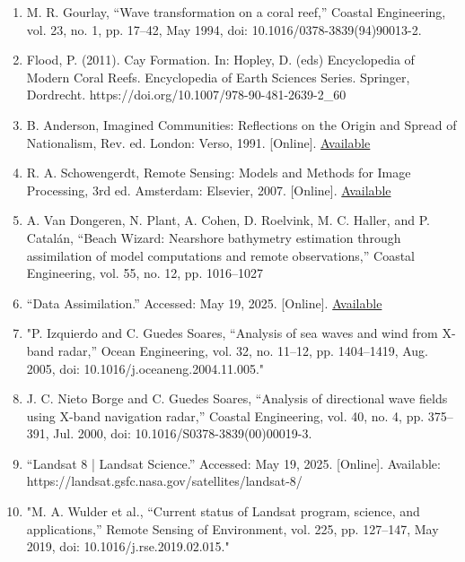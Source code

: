 \documentclass{article}
\begin{document}
\begin{enumerate}
    \item{M. R. Gourlay, “Wave transformation on a coral reef,” Coastal Engineering, vol. 23, no. 1, pp. 17–42, May 1994, doi: 10.1016/0378-3839(94)90013-2.}

    \item{Flood, P. (2011). Cay Formation. In: Hopley, D. (eds) Encyclopedia of Modern Coral Reefs. Encyclopedia of Earth Sciences Series. Springer, Dordrecht. https://doi.org/10.1007/978-90-481-2639-2_60}

    \item{B. Anderson, Imagined Communities: Reflections on the Origin and Spread of Nationalism, Rev. ed. London: Verso, 1991. [Online]. \href{https://search.worldcat.org/title/880118890}{Available}}

    \item{R. A. Schowengerdt, Remote Sensing: Models and Methods for Image Processing, 3rd ed. Amsterdam: Elsevier, 2007. [Online]. \href{https://books.google.com/books?id=KQXNaDH0X-IC&pg=PA2}{Available}}

    \item{A. Van Dongeren, N. Plant, A. Cohen, D. Roelvink, M. C. Haller, and P. Catalán, “Beach Wizard: Nearshore bathymetry estimation through assimilation of model computations and remote observations,” Coastal Engineering, vol. 55, no. 12, pp. 1016–1027}

    \item{“Data Assimilation.” Accessed: May 19, 2025. [Online]. \href{https://www.aoml.noaa.gov/hrd/themes/0/}{Available}}

    \item{"P. Izquierdo and C. Guedes Soares, “Analysis of sea waves and wind from X-band radar,” Ocean Engineering, vol. 32, no. 11–12, pp. 1404–1419, Aug. 2005, doi: 10.1016/j.oceaneng.2004.11.005."}

    \item{J. C. Nieto Borge and C. Guedes Soares, “Analysis of directional wave fields using X-band navigation radar,” Coastal Engineering, vol. 40, no. 4, pp. 375–391, Jul. 2000, doi: 10.1016/S0378-3839(00)00019-3.}

    \item{“Landsat 8 | Landsat Science.” Accessed: May 19, 2025. [Online]. Available: https://landsat.gsfc.nasa.gov/satellites/landsat-8/}

    \item{"M. A. Wulder et al., “Current status of Landsat program, science, and applications,” Remote Sensing of Environment, vol. 225, pp. 127–147, May 2019, doi: 10.1016/j.rse.2019.02.015."}


\end{enumerate}
\end{document}
